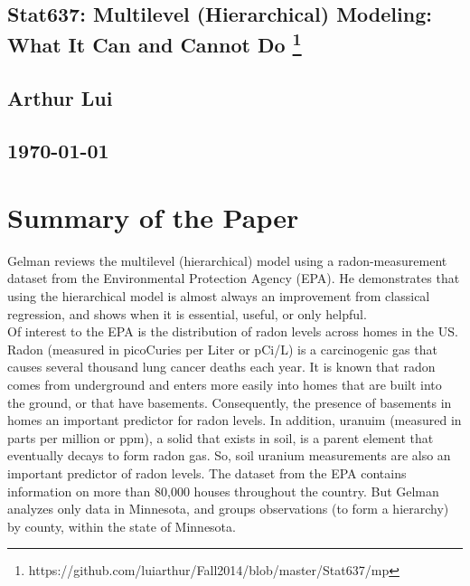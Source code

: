 \documentclass{article}
\begin{document}
\begin{center}
  \section*{\textbf{Stat637: Multilevel (Hierarchical) Modeling: What It Can and Cannot Do}
    \footnote{https://github.com/luiarthur/Fall2014/blob/master/Stat637/mp}
  }  
  \subsection*{\textbf{Arthur Lui}}
  \subsection*{\noindent\today}
\end{center}

\section{Summary of the Paper}
Gelman reviews the multilevel (hierarchical) model using a radon-measurement
dataset from the Environmental Protection Agency (EPA). He demonstrates that
using the hierarchical model is almost always an improvement from classical
regression, and shows when it is essential, useful, or only helpful.\\

\noindent
Of interest to the EPA is the distribution of radon levels across homes in the
US. Radon (measured in picoCuries per Liter or pCi/L) is a carcinogenic gas
that causes several thousand lung cancer deaths each year. It is known that
radon comes from underground and enters more easily into homes that are built
into the ground, or that have basements.  Consequently, the presence of
basements in homes an important predictor for radon levels. In addition,
uranuim (measured in parts per million or ppm), a solid that exists in soil, is
a parent element that eventually decays to form radon gas. So, soil uranium
measurements are also an important predictor of radon levels. The dataset from
the EPA contains information on more than 80,000 houses throughout the country.
But Gelman analyzes only data in Minnesota, and groups observations (to form a
hierarchy) by county, within the state of Minnesota.\\
\end{document}
